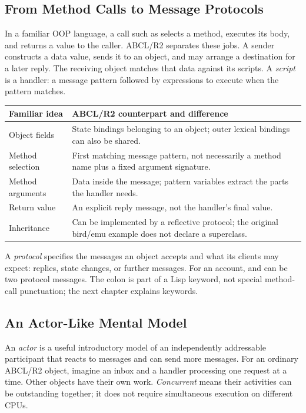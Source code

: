 \subsection{From Method Calls to Message Protocols}

In a familiar OOP language, a call such as 
selects a method, executes its body, and returns a value to the caller.
ABCL/R2 separates these jobs. A sender constructs a data value, sends it
to an object, and may arrange a destination for a later reply.
The receiving object matches that data against its scripts.
A \emph{script} is a handler: a message pattern followed by expressions
to execute when the pattern matches.

\begin{longtable}{L{0.28\textwidth}L{0.62\textwidth}}
\textbf{Familiar idea} & \textbf{ABCL/R2 counterpart and difference}\\\hline
Object fields & State bindings belonging to an object; outer lexical
bindings can also be shared.\\
Method selection & First matching message pattern, not necessarily a
method name plus a fixed argument signature.\\
Method arguments & Data inside the message; pattern variables extract
the parts the handler needs.\\
Return value & An explicit reply message, not the handler's final value.\\
Inheritance & Can be implemented by a reflective protocol; the original
bird/emu example does not declare a superclass.\\
\end{longtable}

A \emph{protocol} specifies the messages an object accepts and what its
clients may expect: replies, state changes, or further messages.
For an account, \code{[:deposit 10]} and  can be two
protocol messages. The colon is part of a Lisp keyword, not special
method-call punctuation; the next chapter explains keywords.

\subsection{An Actor-Like Mental Model}

An \emph{actor} is a useful introductory model of an independently
addressable participant that reacts to messages and can send more messages.
For an ordinary ABCL/R2 object, imagine an inbox and a handler processing
one request at a time. Other objects have their own work.
\emph{Concurrent} means their activities can be outstanding together;
it does not require simultaneous execution on different CPUs.

